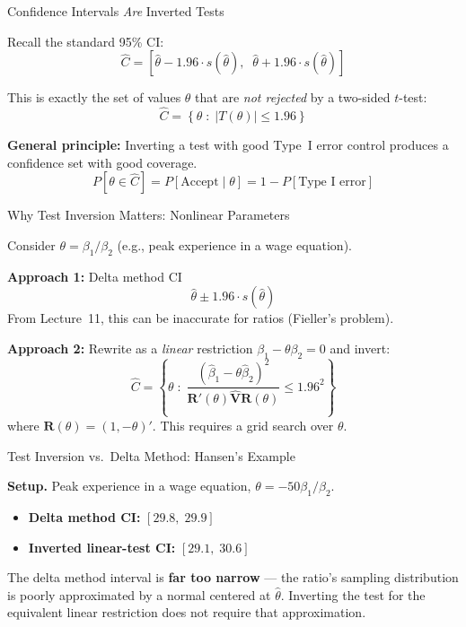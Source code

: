 \documentclass[handout, aspectratio=169]{beamer}
\numberwithin{equation}{section}
\begin{document}
\begin{frame}{Confidence Intervals \emph{Are} Inverted Tests}

Recall the standard 95\% CI:
$$\hat{C} = \left[\hat{\theta} - 1.96\cdot s(\hat{\theta}),\;\; \hat{\theta} + 1.96\cdot s(\hat{\theta})\right]$$

\pause

This is exactly the set of values $\theta$ that are \emph{not rejected} by a two-sided $t$-test:
$$\hat{C} = \left\{\theta \;:\; |T(\theta)| \leq 1.96\right\}$$

\pause
\bigskip

\begin{tcolorbox}[colback=blue!5, colframe=blue!50]
\textbf{General principle:} Inverting a test with good Type~I error control produces a confidence set with good coverage.
$$P[\theta \in \hat{C}] = P[\text{Accept}\mid \theta] = 1 - P[\text{Type I error}]$$
\end{tcolorbox}
\end{frame}

\begin{frame}{Why Test Inversion Matters: Nonlinear Parameters}

Consider $\theta = \beta_1 / \beta_2$ (e.g., peak experience in a wage equation).

\pause
\bigskip

\textbf{Approach 1:} Delta method CI
$$\hat{\theta} \pm 1.96 \cdot s(\hat{\theta})$$
From Lecture~11, this can be inaccurate for ratios (Fieller's problem).

\pause
\bigskip

\textbf{Approach 2:} Rewrite as a \emph{linear} restriction $\beta_1 - \theta\beta_2 = 0$ and invert:
$$\hat{C} = \left\{\theta \;:\; \frac{(\hat{\beta}_1 - \theta\hat{\beta}_2)^2}{\bm{R}'(\theta)\hat{\bm{V}}\bm{R}(\theta)} \leq 1.96^2\right\}$$
where $\bm{R}(\theta) = (1, -\theta)'$.  This requires a grid search over $\theta$.
\end{frame}

\begin{frame}{Test Inversion vs.\ Delta Method: Hansen's Example}

\textbf{Setup.}  Peak experience in a wage equation, $\theta = -50\beta_1/\beta_2$.

\pause
\bigskip

\begin{itemize}
\item \textbf{Delta method CI:} $[29.8,\; 29.9]$
\item \textbf{Inverted linear-test CI:} $[29.1,\; 30.6]$
\end{itemize}

\pause
\bigskip

The delta method interval is \textbf{far too narrow} --- the ratio's sampling distribution is poorly approximated by a normal centered at $\hat{\theta}$.  Inverting the test for the equivalent linear restriction does not require that approximation.
\end{frame}
\end{document}
